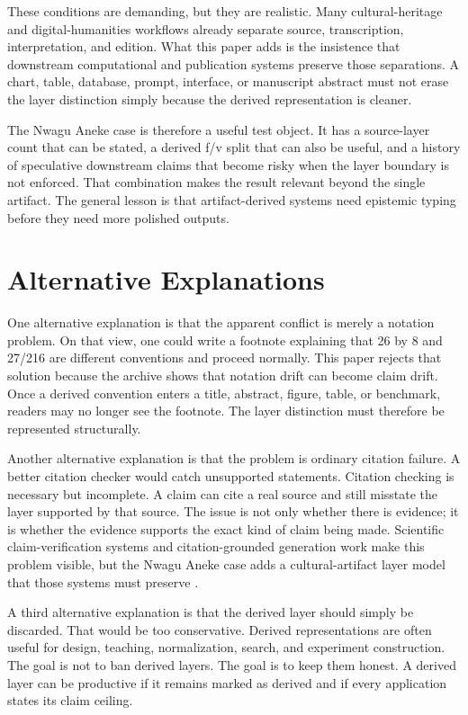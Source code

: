 \documentclass[sigconf,nonacm]{acmart}
\begin{document}
These conditions are demanding, but they are realistic. Many cultural-heritage
and digital-humanities workflows already separate source, transcription,
interpretation, and edition. What this paper adds is the insistence that
downstream computational and publication systems preserve those separations. A
chart, table, database, prompt, interface, or manuscript abstract must not erase
the layer distinction simply because the derived representation is cleaner.

The Nwagu Aneke case is therefore a useful test object. It has a source-layer
count that can be stated, a derived f/v split that can also be useful, and a
history of speculative downstream claims that become risky when the layer
boundary is not enforced. That combination makes the result relevant beyond the
single artifact. The general lesson is that artifact-derived systems need
epistemic typing before they need more polished outputs.

\section{Alternative Explanations}
One alternative explanation is that the apparent conflict is merely a notation
problem. On that view, one could write a footnote explaining that 26 by 8 and
27/216 are different conventions and proceed normally. This paper rejects that
solution because the archive shows that notation drift can become claim drift.
Once a derived convention enters a title, abstract, figure, table, or benchmark,
readers may no longer see the footnote. The layer distinction must therefore be
represented structurally.

Another alternative explanation is that the problem is ordinary citation
failure. A better citation checker would catch unsupported statements. Citation
checking is necessary but incomplete. A claim can cite a real source and still
misstate the layer supported by that source. The issue is not only whether there
is evidence; it is whether the evidence supports the exact kind of claim being
made. Scientific claim-verification systems and citation-grounded generation
work make this problem visible, but the Nwagu Aneke case adds a cultural-artifact
layer model that those systems must preserve \cite{wadden2020scifact,gao2023alce}.

A third alternative explanation is that the derived layer should simply be
discarded. That would be too conservative. Derived representations are often
useful for design, teaching, normalization, search, and experiment construction.
The goal is not to ban derived layers. The goal is to keep them honest. A
derived layer can be productive if it remains marked as derived and if every
application states its claim ceiling.
\end{document}
